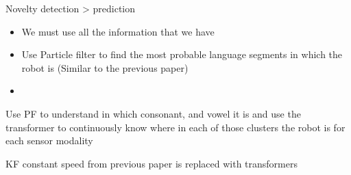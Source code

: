 \begin{frame}[allowframebreaks]{Novelty detection > prediction}
    \begin{itemize}
        \item We must use all the information that we have
        \item Use Particle filter to find the most probable language segments in which the robot is (Similar to the previous paper)
        \item
    \end{itemize}
    
    Use PF to understand in which consonant, and vowel it is and use the transformer to continuously know where in each of those clusters the robot is for each sensor modality
    
    KF constant speed from previous paper is replaced with transformers
\end{frame}